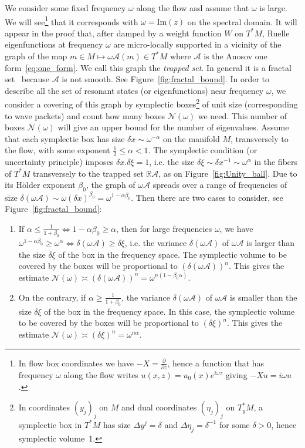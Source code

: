 \documentclass[AHL,Unicode,longabstracts,published]{cedram}
\newcommand{\clA}{\mathcal{A}}
\newcommand{\clN}{\mathcal{N}}
\newcommand{\Imm}{\mathrm{Im}}
\newcommand{\bbR}{\mathbb{R}}
\newcommand{\scrA}{\mathscr{A}}
\newcommand{\Imm}{\mathrm{Im}}
\newcommand{\bbR}{\mathbb{R}}
\begin{document}
We consider some fixed frequency $\omega$ along the flow and assume that $\omega$ is large. We will see\footnote{In flow box coordinates we have $-X=\frac{\partial}{\partial z}$, hence a function that has frequency $\omega$ along the flow writes $u(x,z)=u_{0}(x)e^{i\omega z}$ giving $-Xu=i\omega u$.} that it corresponds with $\omega=\Imm(z)$ on the spectral domain. It will appear in the proof that, after damped by a weight function $W$ on $T^{*}M$, Ruelle eigenfunctions at frequency $\omega$ are micro-locally supported in a vicinity of the graph of the map $m\in M\mapsto\omega\scrA(m)\in T^{*}M$ where $\scrA$ is the Anosov one form~\eqref{eq:one_form}. We call this graph the \emph{trapped set}. In general it is a fractal set~\cite[Chap.11]{falconer_03_book} because $\scrA$ is not smooth. See Figure~\ref{fig:fractal_bound}. In order to describe all the set of resonant states (or eigenfunctions) near frequency $\omega$, we consider a covering of this graph by symplectic boxes\footnote{In coordinates $(y_{j})_{j}$ on $M$ and dual coordinates $(\eta_{j})_{j}$ on $T_{y}^{*}M$, a symplectic box in $T^{*}M$ has size $\Delta y^{j}=\delta$ and $\Delta\eta_{j}=\delta^{-1}$ for some $\delta>0$, hence symplectic volume~1.} of unit size (corresponding to wave packets) and count how many boxes $\clN(\omega)$ we need. This number of boxes $\clN(\omega)$ will give an upper bound for the number of eigenvalues. Assume that each symplectic box has size $\delta x\sim\omega^{-\alpha}$ on the manifold $M$, transversely to the flow, with some exponent $\frac{1}{2}\leq\alpha<1$. The symplectic condition (or uncertainty principle) imposes $\delta x.\delta\xi=1$, i.e. the size $\delta\xi\sim\delta x^{-1}\sim\omega^{\alpha}$ in the fibers of $T^{*}M$ transversely to the trapped set $\bbR\scrA$, as on Figure~\ref{fig:Unity_ball}. Due to its H\"older exponent $\beta_{0}$, the graph of $\omega\scrA$ spreads over a range of frequencies of size {\small{}$\delta(\omega\scrA)\sim\omega(\delta x)^{\beta_{0}}=\omega^{1-\alpha\beta_{0}}$}. Then there are two cases to consider, see Figure~\ref{fig:fractal_bound}:
\begin{enumerate}
\item If $\alpha\leq\frac{1}{1+\beta_{0}}\Leftrightarrow1-\alpha\beta_{0}\geq\alpha$, then for large frequencies $\omega$, we have $\omega^{1-\alpha\beta_{0}}\geq\omega^{\alpha}\Leftrightarrow\delta(\omega\clA)\geq\delta\xi$, i.e. the variance $\delta(\omega\clA)$ of $\omega\clA$ is larger than the size $\delta\xi$ of the box in the frequency space. The symplectic volume to be covered by the boxes will be proportional to $(\delta(\omega\clA))^{n}$. This gives the estimate $\clN(\omega)\asymp(\delta(\omega\clA))^{n}=\omega^{n(1-\beta_{0}\alpha)}$.
\item On the contrary, if $\alpha\geq\frac{1}{1+\beta_{0}}$, the variance $\delta(\omega\clA)$ of $\omega\clA$ is smaller than the size $\delta\xi$ of the box in the frequency space. In this case, the symplectic volume to be covered by the boxes will be proportional to $(\delta\xi)^{n}$. This gives the estimate $\clN(\omega)\asymp(\delta\xi)^{n}=\omega^{n\alpha}$.
\end{enumerate}
\end{document}
